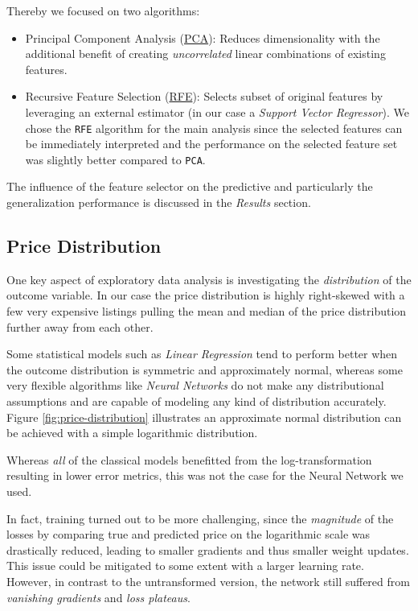 Thereby we focused on two algorithms:
\begin{itemize}
    \item Principal Component Analysis (\href{https://scikit-learn.org/stable/modules/generated/sklearn.decomposition.PCA.html}{PCA}):
          Reduces dimensionality with the additional benefit of creating \emph{uncorrelated} linear combinations of existing features.
    \item Recursive Feature Selection (\href{https://scikit-learn.org/stable/modules/generated/sklearn.feature_selection.RFE.html}{RFE}):
          Selects subset of original features by leveraging an external estimator (in our case a \emph{Support Vector Regressor}).
          We chose the \texttt{RFE} algorithm for the main analysis since the selected features can be immediately interpreted and the performance on the selected feature set was slightly better compared to \texttt{PCA}.

\end{itemize}

The influence of the feature selector on the predictive and particularly the generalization performance is discussed in the \emph{Results} section.

\subsection{Price Distribution} \label{appendix:price-distribution}

One key aspect of exploratory data analysis is investigating the \emph{distribution} of the outcome variable.
In our case the price distribution is highly right-skewed with a few very expensive listings pulling the mean and median of the price distribution further away from each other.

Some statistical models such as \emph{Linear Regression} tend to perform better when the outcome distribution is symmetric and approximately normal, whereas some very flexible algorithms like \emph{Neural Networks} do not make any distributional assumptions and are capable of modeling any kind of distribution accurately.
Figure \ref{fig:price-distribution} illustrates an approximate normal distribution can be achieved with a simple logarithmic distribution.

Whereas \emph{all} of the classical models benefitted from the log-transformation resulting in lower error metrics, this was not the case for the Neural Network we used.

In fact, training turned out to be more challenging, since the \emph{magnitude} of the losses by comparing true and predicted price on the logarithmic scale was drastically reduced, leading to smaller gradients and thus smaller weight updates.
This issue could be mitigated to some extent with a larger learning rate.
However, in contrast to the untransformed version, the network still suffered from \emph{vanishing gradients} and \emph{loss plateaus}.

